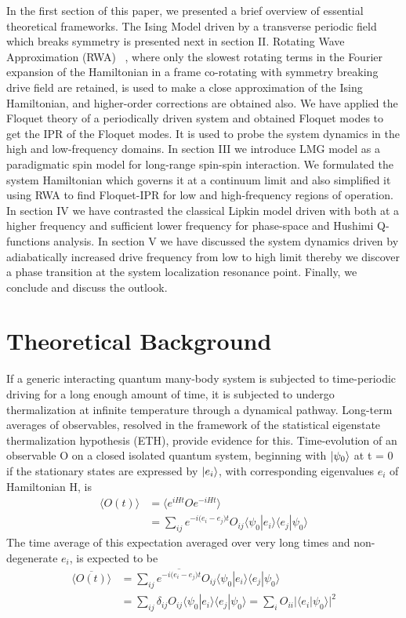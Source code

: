 \documentclass[%
 reprint,
 amsmath,amssymb,
 aps,
]{revtex4-2}
\begin{document}
In the first section of this paper, we presented a brief overview of essential theoretical frameworks. The Ising Model driven by a transverse periodic field which breaks symmetry is presented next in section II. Rotating Wave Approximation (RWA) ~\cite{fujii_introduction_2017}, where only the slowest rotating terms in the Fourier expansion of the Hamiltonian in a frame co-rotating with symmetry breaking drive field are retained, is used to make a close approximation of the Ising Hamiltonian, and higher-order corrections are obtained also. We have applied the Floquet theory of a periodically driven system and obtained Floquet modes to get the IPR of the Floquet modes. It is used to probe the system dynamics in the high and low-frequency domains. In section III we introduce  LMG model as a paradigmatic spin model for long-range spin-spin interaction. We formulated the system Hamiltonian which governs it at a continuum limit and also simplified it using RWA to find Floquet-IPR for low and high-frequency regions of operation. In section IV we have contrasted the classical Lipkin model driven with both at a higher frequency and sufficient lower frequency for phase-space and Hushimi Q-functions analysis. In section V we have discussed the  system dynamics driven by adiabatically increased drive frequency from low to high limit thereby we discover a phase transition at the system localization resonance point. Finally, we conclude and discuss the outlook. 

\section{\label{sec:level1} Theoretical Background}
If a generic interacting quantum many-body system is subjected to time-periodic driving for a long enough amount of time, it is subjected to undergo thermalization at infinite temperature through a dynamical pathway. Long-term averages of observables, resolved in the framework of the statistical eigenstate thermalization hypothesis (ETH), provide evidence for this. Time-evolution of an observable O on a closed isolated quantum system, beginning with $\ket{\psi_0}$ at t = 0 if the stationary states are expressed by $\ket{e_i}$, with corresponding eigenvalues $e_i$ of Hamiltonian H, is 
\begin{align}
\langle O (t) \rangle &= \langle e^{iHt}Oe^{-iHt}\rangle\nonumber\\
&= \sum_{ij}e^{-i\big(e_i-e_j\big)t} O_{ij} \langle\psi_0|e_i\rangle \langle e_j|\psi_0\rangle
\end{align}
The time average of this expectation averaged over very long times and non-degenerate $e_i$, is expected to be
\begin{align}
\overline{\langle O (t) \rangle} &= \sum_{ij}\overline{e^{-i\big(e_i-e_j\big)t}}O_{ij} \langle\psi_0|e_i\rangle \langle e_j|\psi_0\rangle\nonumber\\
&= \sum_{ij}\delta_{ij}O_{ij} \langle\psi_0|e_i\rangle \langle e_j|\psi_0\rangle =\sum_i O_{ii}\big\vert \langle e_i\vert\psi_0\rangle \big\vert^2
\end{align}
\end{document}
